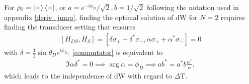 For $\rho_0 = \ket{+} \bra{+}$, or $a = e^{-i \phi_D}/\sqrt{2}, b = 1/\sqrt{2}$ following the notation used in appendix \ref{deriv_jump}, finding the optimal solution of $\mathrm{dW}$ for $N = 2$ requires finding the transducer setting that ensures
\begin{align}\label{commutator}
	[H_{DS}, H_S] = [\delta \sigma_{+} + \delta^* \sigma_{-}, \alpha \sigma_{+} + \alpha^* \sigma_{-}] = 0
\end{align}
with $\delta = \frac{1}{2} \sin{\theta_D} e^{i \phi_D}$.
\ref{commutator} is equivalent to
\begin{align*}
	\Im{\alpha \delta^*} = 0 \implies \arg{\alpha} = \phi_D \implies a b^* = a^* b \frac{\alpha^*}{\alpha},
\end{align*}
which leads to the independence of dW with regard to $\Delta \mathrm{T}$. 